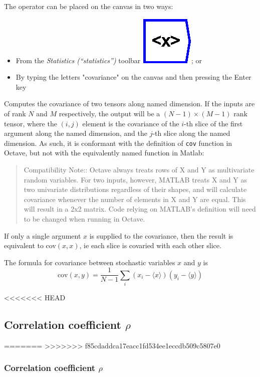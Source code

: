 The operator can be placed on the canvas in two ways:
\begin{itemize}
\item From the \emph{Statistics (``statistics'')} toolbar \includegraphics{images/mean};
or 
\item By typing the letters "covariance" on the canvas and then pressing
the Enter key
\end{itemize}
Computes the covariance of two tensors along named dimension. If the
inputs are of rank $N$ and $M$ respectively, the output will be
a $(N-1)\times(M-1)$ rank tensor, where the $(i,j)$ element is the
covariance of the $i$-th slice of the first argument along the named
dimension, and the $j$-th slice along the named dimension. As such,
it is conformant with the definition of \texttt{cov} function in Octave,
but not with the equivalently named function in Matlab: 
\begin{quote}
Compatibility Note:: Octave always treats rows of X and Y as multivariate
random variables. For two inputs, however, MATLAB treats X and Y as
two univariate distributions regardless of their shapes, and will
calculate covariance whenever the number of elements in X and Y are
equal. This will result in a 2x2 matrix. Code relying on MATLAB's
definition will need to be changed when running in Octave. 
\end{quote}
If only a single argument $x$ is supplied to the covariance, then
the result is equivalent to cov$(x,x)$, ie each slice is covaried
with each other slice.

The formula for covariance between stochastic variables $x$ and $y$
is 
\[
\mathrm{cov}(x,y)=\frac{1}{N-1}\sum_{i}(x_{i}-\langle x\rangle)(y_{i}-\langle y\rangle)
\]

<<<<<<< HEAD
   \subsection{Correlation coefficient $\rho$}\label{Operation:correlation}
=======
>>>>>>> f85cdaddca17eacc1fd534ee1eccdb509c5807e0

\subsubsection{Correlation coefficient $\rho$}

